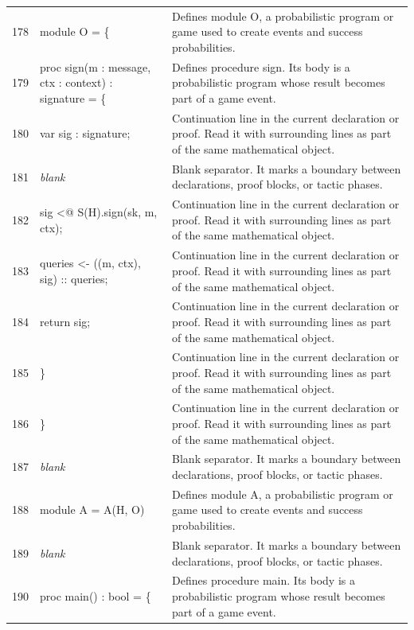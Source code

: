\documentclass[10pt]{article}
\begin{document}
\begin{longtable}{r L{0.53\textwidth} L{0.37\textwidth}}
178 & {\ttfamily\scriptsize   module O = \{} & Defines module O, a probabilistic program or game used to create events and success probabilities. \\
179 & {\ttfamily\scriptsize     proc sign(m : message, ctx : context) : signature = \{} & Defines procedure sign.  Its body is a probabilistic program whose result becomes part of a game event. \\
180 & {\ttfamily\scriptsize       var sig : signature;} & Continuation line in the current declaration or proof.  Read it with surrounding lines as part of the same mathematical object. \\
181 & {\ttfamily\scriptsize \emph{blank}} & Blank separator.  It marks a boundary between declarations, proof blocks, or tactic phases. \\
182 & {\ttfamily\scriptsize       sig <@ S(H).sign(sk, m, ctx);} & Continuation line in the current declaration or proof.  Read it with surrounding lines as part of the same mathematical object. \\
183 & {\ttfamily\scriptsize       queries <- ((m, ctx), sig) :: queries;} & Continuation line in the current declaration or proof.  Read it with surrounding lines as part of the same mathematical object. \\
184 & {\ttfamily\scriptsize       return sig;} & Continuation line in the current declaration or proof.  Read it with surrounding lines as part of the same mathematical object. \\
185 & {\ttfamily\scriptsize     \}} & Continuation line in the current declaration or proof.  Read it with surrounding lines as part of the same mathematical object. \\
186 & {\ttfamily\scriptsize   \}} & Continuation line in the current declaration or proof.  Read it with surrounding lines as part of the same mathematical object. \\
187 & {\ttfamily\scriptsize \emph{blank}} & Blank separator.  It marks a boundary between declarations, proof blocks, or tactic phases. \\
188 & {\ttfamily\scriptsize   module A = A(H, O)} & Defines module A, a probabilistic program or game used to create events and success probabilities. \\
189 & {\ttfamily\scriptsize \emph{blank}} & Blank separator.  It marks a boundary between declarations, proof blocks, or tactic phases. \\
190 & {\ttfamily\scriptsize   proc main() : bool = \{} & Defines procedure main.  Its body is a probabilistic program whose result becomes part of a game event. \\

\end{longtable}
\end{document}
